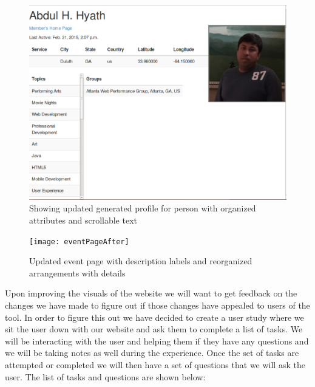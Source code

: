 \documentclass[draftclsnofoot,10pt,onecolumn]{IEEEtran} %
\begin{document}
\begin{enumerate}[label*=\arabic*.]
\begin{figure}[H]
\begin{center}
  \includegraphics[width=5in, frame]{peopleProfileAfter}
  \captionsetup{width=.4\linewidth}
  \centering
  \caption{Showing updated generated profile for person with 
  organized attributes and scrollable text }
  \end{center}
\end{figure}

\begin{figure}[H]
  \begin{center}
  
  \texttt{[image: eventPageAfter]}
  \captionsetup{width=.4\linewidth}
  \centering
  \caption{Updated event page with description labels and reorganized arrangements
  with details}
  \end{center}
\end{figure}

    Upon improving the visuals of the website we will want to get feedback on the changes we have 
    made to figure out if those changes have appealed to users of the tool. In order to figure this	
    out we have decided to create a user study where we sit the user down with our website and ask 
    them to complete a list of tasks. We will be interacting with the user and helping them if they 
    have any questions and we will be taking notes as well during the experience.
    Once the set of tasks are attempted or completed we will then have a set of questions that we 
    will ask the user. The list of tasks and questions are shown below: \\


\end{enumerate}
\end{document}
